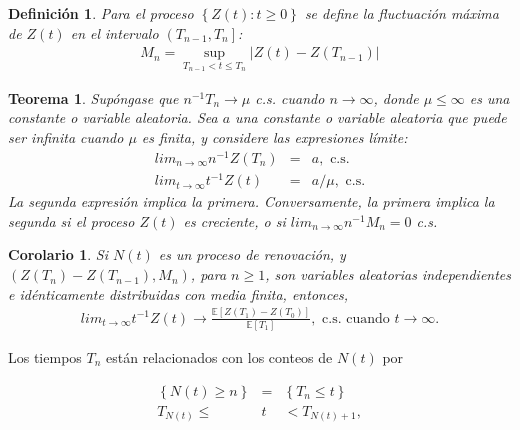 \documentclass{article}
\newtheorem{Def}{Definición}
\newtheorem{Teo}{Teorema}
\newtheorem{Coro}{Corolario}
\newcommand{\esp}{\mathbb{E}}
\begin{document}
\begin{Def}
Para el proceso $\left\{Z\left(t\right):t\geq0\right\}$ se define la fluctuaci\'on m\'axima de $Z\left(t\right)$ en el intervalo $\left(T_{n-1},T_{n}\right]$:
\begin{eqnarray*}
M_{n}=\sup_{T_{n-1}<t\leq T_{n}}|Z\left(t\right)-Z\left(T_{n-1}\right)|
\end{eqnarray*}
\end{Def}

\begin{Teo}
Sup\'ongase que $n^{-1}T_{n}\rightarrow\mu$ c.s. cuando $n\rightarrow\infty$, donde $\mu\leq\infty$ es una constante o variable aleatoria. Sea $a$ una constante o variable aleatoria que puede ser infinita cuando $\mu$ es finita, y considere las expresiones l\'imite:
\begin{eqnarray}
lim_{n\rightarrow\infty}n^{-1}Z\left(T_{n}\right)&=&a,\textrm{ c.s.}\\
lim_{t\rightarrow\infty}t^{-1}Z\left(t\right)&=&a/\mu,\textrm{ c.s.}
\end{eqnarray}
La segunda expresi\'on implica la primera. Conversamente, la primera implica la segunda si el proceso $Z\left(t\right)$ es creciente, o si $lim_{n\rightarrow\infty}n^{-1}M_{n}=0$ c.s.
\end{Teo}

\begin{Coro}
Si $N\left(t\right)$ es un proceso de renovaci\'on, y $\left(Z\left(T_{n}\right)-Z\left(T_{n-1}\right),M_{n}\right)$, para $n\geq1$, son variables aleatorias independientes e id\'enticamente distribuidas con media finita, entonces,
\begin{eqnarray}
lim_{t\rightarrow\infty}t^{-1}Z\left(t\right)\rightarrow\frac{\esp\left[Z\left(T_{1}\right)-Z\left(T_{0}\right)\right]}{\esp\left[T_{1}\right]},\textrm{ c.s. cuando  }t\rightarrow\infty.
\end{eqnarray}
\end{Coro}
%
%

Los tiempos $T_{n}$ est\'an relacionados con los conteos de $N\left(t\right)$ por

\begin{eqnarray*}
\left\{N\left(t\right)\geq n\right\}&=&\left\{T_{n}\leq t\right\}\\
T_{N\left(t\right)}\leq &t&<T_{N\left(t\right)+1},
\end{eqnarray*}
\end{document}

